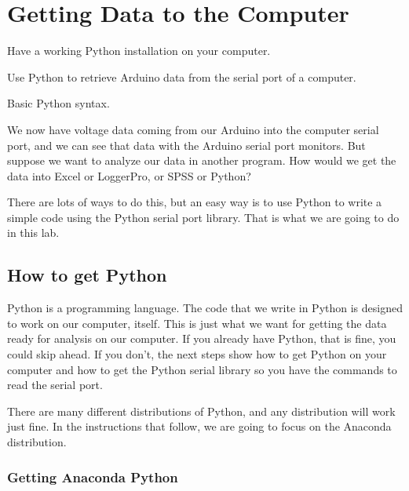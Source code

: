 
\chapter{Getting Data to the Computer}

\objectives
{
\item Have a working Python installation on your computer.
\item Use Python to retrieve Arduino data from the serial port of a computer.
}

\review
{
\item Basic Python syntax.
}

We now have voltage data coming from our Arduino into the computer serial
port, and we can see that data with the Arduino serial port monitors. But
suppose we want to analyze our data in another program. How would we get the
data into Excel or LoggerPro, or SPSS or Python?

There are lots of ways to do this, but an easy way is to use Python
to write a simple code using the Python serial port library. That is
what we are going to do in this lab.

\section{How to get Python}

Python is a programming language. The code that we write in Python
is designed to work on
our computer, itself. This is just what we want for getting the data ready
for analysis on our computer. If you already have Python, that is fine, you
could skip ahead. If you don't, the next steps show how to get Python on
your computer and how to get the Python serial library so you have the
commands to read the serial port. 


There are many different distributions of Python, and any distribution will 
work just fine. In the instructions that follow, we are going to focus on 
the Anaconda distribution.

\subsection{Getting Anaconda Python}

